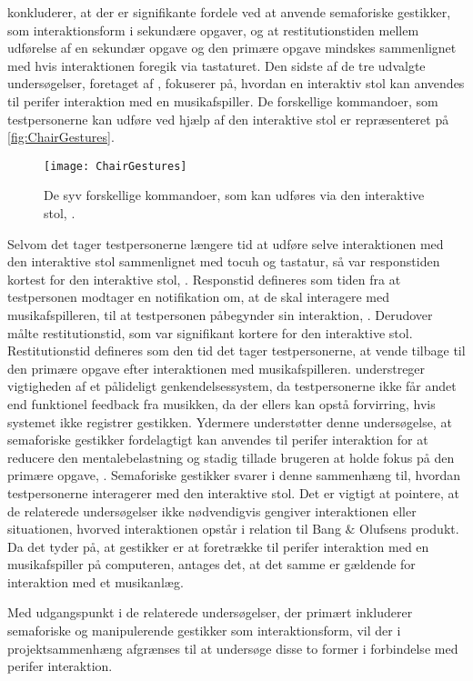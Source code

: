 \textcite[s. 1964]{PDF:AStudyOnTheUseOfSemaphoricGestures} konkluderer, at der er signifikante fordele ved at anvende semaforiske gestikker, som interaktionsform i sekundære opgaver, og at restitutionstiden mellem udførelse af en sekundær opgave og den primære opgave mindskes sammenlignet med hvis interaktionen foregik via tastaturet.\blankline
%
Den sidste af de tre udvalgte undersøgelser, foretaget af \textcite[ss. 6-9]{PDF:AChairAsUbiquitousInputDevice}, fokuserer på, hvordan en interaktiv stol kan anvendes til perifer interaktion med en musikafspiller. De forskellige kommandoer, som testpersonerne kan udføre ved hjælp af den interaktive stol er repræsenteret på \autoref{fig:ChairGestures}. 
%
\begin{figure}[H]
	\centering
	\texttt{[image: ChairGestures]}
	\caption{De syv forskellige kommandoer, som kan udføres via den interaktive stol, \parencite[s. 3]{PDF:AChairAsUbiquitousInputDevice}.}
	\label{fig:ChairGestures}
\end{figure}
\noindent
%
Selvom det tager testpersonerne længere tid at udføre selve interaktionen med den interaktive stol sammenlignet med tocuh og tastatur, så var responstiden kortest for den interaktive stol, \textcite[s. 7]{PDF:AChairAsUbiquitousInputDevice}. Responstid defineres som tiden fra at testpersonen modtager en notifikation om, at de skal interagere med musikafspilleren, til at testpersonen påbegynder sin interaktion, \parencite[s. 6]{PDF:AChairAsUbiquitousInputDevice}. Derudover målte \textcite[s. 7]{PDF:AChairAsUbiquitousInputDevice} restitutionstid, som var signifikant kortere for den interaktive stol. Restitutionstid defineres som den tid det tager testpersonerne, at vende tilbage til den primære opgave efter interaktionen med musikafspilleren. \textcite[s. 8]{PDF:AChairAsUbiquitousInputDevice} understreger vigtigheden af et pålideligt genkendelsessystem, da testpersonerne ikke får andet end funktionel feedback fra musikken, da der ellers kan opstå forvirring, hvis systemet ikke registrer gestikken. Ydermere understøtter denne undersøgelse, at semaforiske gestikker fordelagtigt kan anvendes til perifer interaktion for at reducere den mentalebelastning og stadig tillade brugeren at holde fokus på den primære opgave, \parencite[s. 8]{PDF:AChairAsUbiquitousInputDevice}. Semaforiske gestikker svarer i denne sammenhæng til, hvordan testpersonerne interagerer med den interaktive stol. \blankline
%
Det er vigtigt at pointere, at de relaterede undersøgelser ikke nødvendigvis gengiver interaktionen eller situationen, hvorved interaktionen opstår i relation til Bang $\&$ Olufsens produkt. Da det tyder på, at gestikker er at foretrække til perifer interaktion med en musikafspiller på computeren, antages det, at det samme er gældende for interaktion med et musikanlæg. 

Med udgangspunkt i de relaterede undersøgelser, der primært inkluderer semaforiske og manipulerende gestikker som interaktionsform, vil der i projektsammenhæng afgrænses til at undersøge disse to former i forbindelse med perifer interaktion.   
